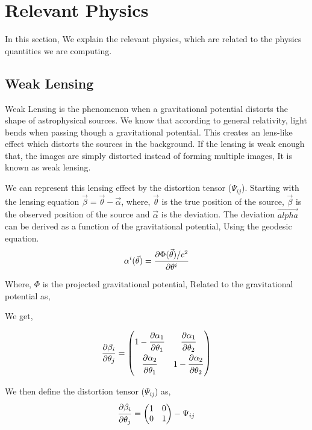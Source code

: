 \chapter{Relevant Physics}
\label{relevantphysics}
In this section, We explain the relevant physics, which are related to the physics quantities we are computing.
\section{Weak Lensing}
\label{weaklensing}
Weak Lensing is the phenomenon when a gravitational potential distorts the shape of astrophysical sources. We know that
according to general relativity, light bends when passing though a gravitational potential. This creates an lens-like effect
which distorts the sources in the background. If the lensing is weak enough that, the images are simply distorted instead of forming
multiple images, It is known as weak lensing. 

We can represent this lensing effect by the distortion tensor ($\Psi_{ij}$).
Starting with the lensing equation $\vec{\beta} = \vec{\theta} - \vec{\alpha}$, where, $\vec{\theta}$ is the true position of the
source, $\vec{\beta}$ is the observed position of the source and $\vec{\alpha}$ is the deviation.
The deviation $\vec{alpha}$ can be derived as a function of the gravitational potential, Using the geodesic equation.
\begin{align}
  \begin{split}
    \alpha^i ( \vec{\theta}) = \dfrac{\strut \partial \Phi(\vec{\theta})/c^2}{\strut \partial \theta^i}
  \end{split}
\end{align}
Where, $\Phi$ is the projected gravitational potential, Related to the gravitational potential as,

We get,

\begin{align}
  \label{derbeta}
  \begin{split}
    \frac{\partial \beta_i}{\partial \theta_j} =
    \begin{pmatrix}
      1 - \dfrac{\strut \partial \alpha_1}{\strut \partial \theta_1}& \dfrac{\strut \partial \alpha_1}{\strut \partial \theta_2} \\
       \dfrac{\strut \partial \alpha_2}{\strut \partial \theta_1}& 1 - \dfrac{\strut \partial \alpha_2}{\strut \partial \theta_2}\\
    \end{pmatrix}
  \end{split}
\end{align}

We then define the distortion tensor ($\Psi_{ij}$) as,
\begin{align}
  \begin{split}
    \dfrac{\strut \partial \beta_i}{\strut \partial \theta_j} =
    \begin{pmatrix}
      1 & 0 \\
      0 & 1\\
    \end{pmatrix}
     - \Psi_{ij}
  \end{split}
\end{align}

